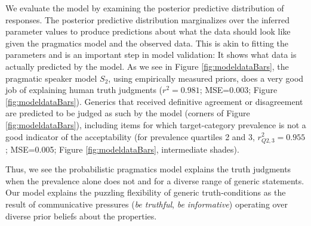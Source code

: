 \documentclass[12pt,letterpaper]{article}
\begin{document}
We evaluate the model by examining the posterior predictive distribution of responses. 
The posterior predictive distribution marginalizes over the inferred parameter values to produce predictions about what the data should look like given the pragmatics model and the observed data. 
This is akin to fitting the parameters and is an important step in model validation: It shows what data is actually predicted by the model. 
As we see in Figure \ref{fig:modeldataBars}, the pragmatic speaker model $S_2$, using empirically measured priors, does a very good job of explaining human truth judgments ($r^2=0.981$; MSE=0.003; Figure \ref{fig:modeldataBars}). 
Generics that received definitive agreement or disagreement are predicted to be judged as such by the model (corners of Figure \ref{fig:modeldataBars}), including items for which target-category prevalence is not a good indicator of the acceptability (for prevalence quartiles 2 and 3, $r_{Q2,3}^2=0.955$; MSE=0.005; Figure \ref{fig:modeldataBars}, intermediate shades).

Thus, we see the probabilistic pragmatics model explains the truth judgments when the prevalence alone does not and for a diverse range of generic statements.
Our model explains the puzzling flexibility of generic truth-conditions as the result of communicative pressures (\emph{be truthful}, \emph{be informative}) operating over diverse prior beliefs about the properties. 
 



%
\end{document}
